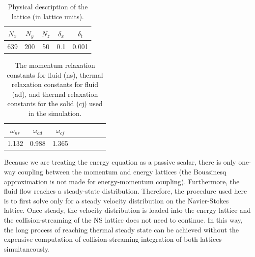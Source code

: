 
\begin {table}[ht] %
\caption{Physical description of the lattice (in lattice units).}
\label{tab:lbm-parameters} \centering %
\begin {tabular}{ ccccc }
\toprule %
$N_x$   &   $N_y$  &   $N_z$    &   $\delta_x$   & $\delta_t$    \\\toprule
639      &   200     &   50     &    0.1         &  0.001        \\\bottomrule
\end{tabular}
\end{table}

\begin {table}[ht] %
\caption{The momentum relaxation constants for fluid (ns), thermal relaxation constants for fluid (ad), and thermal relaxation constants for the solid (cj) used in the simulation.}
\label{tab:lbm-relaxations} \centering %
\begin {tabular}{ cccccccc }
\toprule %
$\omega_{ns}$ &  $\omega_{ad}$  &   $\omega_{cj}$     \\\toprule
1.132      &  0.988       &   1.365          \\\bottomrule
\end{tabular}
\end{table}

Because we are treating the energy equation as a passive scalar, there is only one-way coupling between the momentum and energy lattices (the Boussinesq approximation is not made for energy-momentum coupling). Furthermore, the fluid flow reaches a steady-state distribution. Therefore, the procedure used here is to first solve only for a steady velocity distribution on the Navier-Stokes lattice. Once steady, the velocity distribution is loaded into the energy lattice and the collision-streaming of the NS lattice does not need to continue. In this way, the long process of reaching thermal steady state can be achieved without the expensive computation of collision-streaming integration of both lattices simultaneously.



